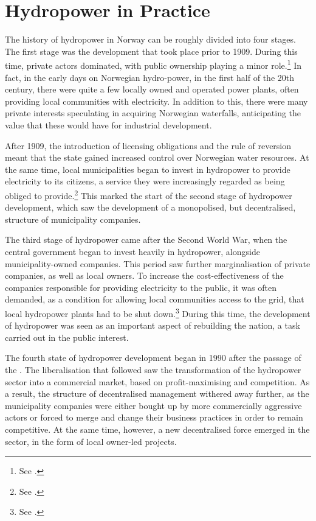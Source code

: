 \section{Hydropower in Practice}

The history of hydropower in Norway can be roughly divided into four stages. The first stage was the development that took place prior to 1909. During this time, private actors dominated, with public ownership playing a minor role.\footnote{See \cite{otprp61}.} In fact, in the early days on Norwegian hydro-power, in the first half of the 20th century, there were quite a few locally owned and operated power plants, often providing local communities with electricity. In addition to this, there were many private interests speculating in acquiring Norwegian waterfalls, anticipating the value that these would have for industrial development. 

After 1909, the introduction of licensing obligations and the rule of reversion meant that the state gained increased control over Norwegian water resources. At the same time, local municipalities began to invest in hydropower to provide electricity to its citizens, a service they were increasingly regarded as being obliged to provide.\footnote{See \cite{otprp61}.} This marked the start of the second stage of hydropower development, which saw the development of a monopolised, but decentralised, structure of municipality companies.

The third stage of hydropower came after the Second World War, when the central government began to invest heavily in hydropower, alongside municipality-owned companies. This period saw further marginalisation of private companies, as well as local owners. To increase the cost-effectiveness of the companies responsible for providing electricity to the public, it was often demanded, as a condition for allowing local communities access to the grid, that local hydropower plants had to be shut down.\footnote{See \cite[p.111]{hindrum94}.} During this time, the development of hydropower was seen as an important aspect of rebuilding the nation, a task carried out in the public interest.

The fourth state of hydropower development began in 1990 after the passage of the \cite{ea90}. The liberalisation that followed saw the transformation of the hydropower sector into a commercial market, based on profit-maximising and competition. As a result, the structure of decentralised management withered away further, as the municipality companies were either bought up by more commercially aggressive actors or forced to merge and change their business practices in order to remain competitive. At the same time, however, a new decentralised force emerged in the sector, in the form of local owner-led projects. 

